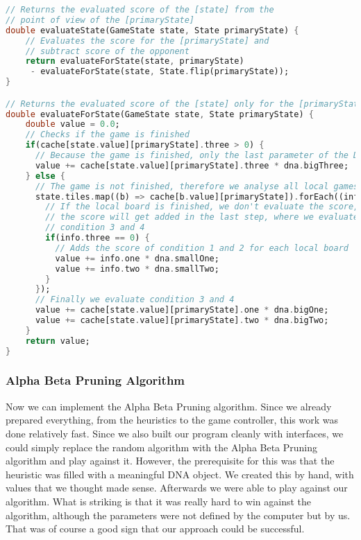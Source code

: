 \begin{lstlisting}[language=Dart,caption={Implementation of the evaluation}]
// Returns the evaluated score of the [state] from the
// point of view of the [primaryState]
double evaluateState(GameState state, State primaryState) {
	// Evaluates the score for the [primaryState] and
	// subtract score of the opponent
    return evaluateForState(state, primaryState)
     - evaluateForState(state, State.flip(primaryState));
}

// Returns the evaluated score of the [state] only for the [primaryState]
double evaluateForState(GameState state, State primaryState) {
    double value = 0.0;
    // Checks if the game is finished
    if(cache[state.value][primaryState].three > 0) {
      // Because the game is finished, only the last parameter of the DNA is relevant
      value += cache[state.value][primaryState].three * dna.bigThree;
    } else {
      // The game is not finished, therefore we analyse all local games
      state.tiles.map((b) => cache[b.value][primaryState]).forEach((info) {
        // If the local board is finished, we don't evaluate the score, because
        // the score will get added in the last step, where we evaluate
        // condition 3 and 4
        if(info.three == 0) {
       	  // Adds the score of condition 1 and 2 for each local board
          value += info.one * dna.smallOne;
          value += info.two * dna.smallTwo;
        }
      });
      // Finally we evaluate condition 3 and 4
      value += cache[state.value][primaryState].one * dna.bigOne;
      value += cache[state.value][primaryState].two * dna.bigTwo;
    }
    return value;
}
\end{lstlisting}

\subsubsection{Alpha Beta Pruning Algorithm}
Now we can implement the Alpha Beta Pruning algorithm. Since we already prepared everything, from the heuristics to the game controller, this work was done relatively fast. Since we also built our program cleanly with interfaces, we could simply replace the random algorithm with the Alpha Beta Pruning algorithm and play against it. However, the prerequisite for this was that the heuristic was filled with a meaningful DNA object. We created this by hand, with values that we thought made sense. Afterwards we were able to play against our algorithm. What is striking is that it was really hard to win against the algorithm, although the parameters were not defined by the computer but by us. That was of course a good sign that our approach could be successful.

